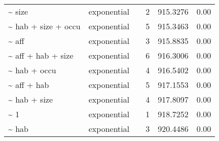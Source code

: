 \begin{table}[ht]
\begin{tabular}{llrrrr}
  \~{} size & exponential &  & 2 & 915.3276 & 0.00 \\ 
  \~{} hab + size + occu & exponential &  & 5 & 915.3463 & 0.00 \\ 
  \~{} aff & exponential &  & 3 & 915.8835 & 0.00 \\ 
  \~{} aff + hab + size & exponential &  & 6 & 916.3006 & 0.00 \\ 
  \~{} hab + occu & exponential &  & 4 & 916.5402 & 0.00 \\ 
  \~{} aff + hab & exponential &  & 5 & 917.1553 & 0.00 \\ 
  \~{} hab + size & exponential &  & 4 & 917.8097 & 0.00 \\ 
  \~{} 1 & exponential &  & 1 & 918.7252 & 0.00 \\ 
  \~{} hab & exponential &  & 3 & 920.4486 & 0.00 \\ 
  \end{tabular}
\label{tab:mod}
\end{table}
